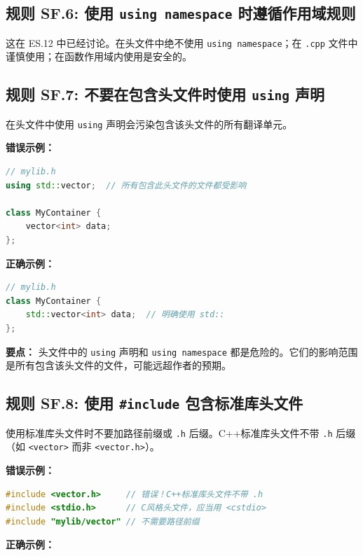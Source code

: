 \subsection*{\textbf{规则 SF.6:} 使用 \texttt{using namespace} 时遵循作用域规则}

这在 ES.12 中已经讨论。在头文件中绝不使用 \texttt{using namespace}；在 \texttt{.cpp} 文件中谨慎使用；在函数作用域内使用是安全的。

\subsection*{\textbf{规则 SF.7:} 不要在包含头文件时使用 \texttt{using} 声明}

在头文件中使用 \texttt{using} 声明会污染包含该头文件的所有翻译单元。

\textbf{错误示例：}

\begin{lstlisting}[language=C++]
// mylib.h
using std::vector;  // 所有包含此头文件的文件都受影响

class MyContainer {
    vector<int> data;
};
\end{lstlisting}

\textbf{正确示例：}

\begin{lstlisting}[language=C++]
// mylib.h
class MyContainer {
    std::vector<int> data;  // 明确使用 std::
};
\end{lstlisting}

\textbf{要点：} 头文件中的 \texttt{using} 声明和 \texttt{using namespace} 都是危险的。它们的影响范围是所有包含该头文件的文件，可能远超作者的预期。

\subsection*{\textbf{规则 SF.8:} 使用 \texttt{\#include} 包含标准库头文件}

使用标准库头文件时不要加路径前缀或 \texttt{.h} 后缀。C++标准库头文件不带 \texttt{.h} 后缀（如 \texttt{<vector>} 而非 \texttt{<vector.h>}）。

\textbf{错误示例：}

\begin{lstlisting}[language=C++]
#include <vector.h>     // 错误！C++标准库头文件不带 .h
#include <stdio.h>      // C风格头文件，应当用 <cstdio>
#include "mylib/vector" // 不需要路径前缀
\end{lstlisting}

\textbf{正确示例：}


